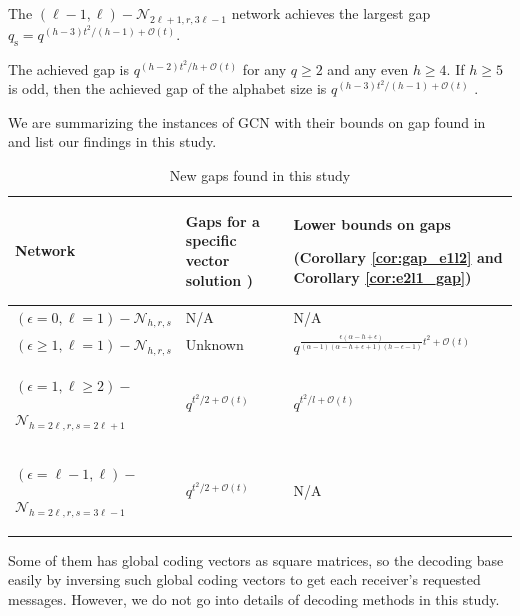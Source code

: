 The $\left(\ell-1,\ell\right)-\mathcal{N}_{2\ell+1,r,3\ell-1}$ network
achieves the largest gap $q_{\mathrm{s}}=q^{(h-3)t^{2}/\left(h-1\right)+\mathcal{O}(t)}$.
\begin{rem}
The achieved gap is $q^{(h-2)t^{2}/h+\mathcal{O}(t)}$ for any $q\geq2$
and any even $h\geq4$. If $h\geq5$ is odd, then the achieved gap
of the alphabet size is $q^{(h-3)t^{2}/\left(h-1\right)+\mathcal{O}(t)}$
\cite{Wachter-Zeh:2018}.
\end{rem}
We are summarizing the instances of GCN with their bounds on gap found
in \cite{Wachter-Zeh:2018} and list our findings in this study.
\begin{table}

\caption{New gaps found in this study \label{tab:New-gap-found}}

\begin{centering}
\begin{tabular}{|>{\centering}p{0.15\paperwidth}|>{\centering}p{0.1\paperwidth}|>{\centering}p{0.2\paperwidth}|}
\hline 
\centering{}Network & \centering{}Gaps for a specific vector solution \cite{Wachter-Zeh:2018}) & \begin{centering}
Lower bounds on gaps 
\par\end{centering}
\centering{}(Corollary \ref{cor:gap_e1l2} and Corollary \ref{cor:e2l1_gap})\tabularnewline
\hline 
\hline 
\centering{}$\left(\epsilon=0,\ell=1\right)-\mathcal{N}_{h,r,s}$ & \centering{}N/A & \centering{}N/A\tabularnewline
\hline 
\centering{}$\left(\epsilon\geq1,\ell=1\right)-\mathcal{N}_{h,r,s}$ & \centering{}Unknown & \centering{}$q^{\frac{\epsilon\left(\alpha-h+\epsilon\right)}{\left(\alpha-1\right)\left(\alpha-h+\epsilon+1\right)\left(h-\epsilon-1\right)}t^{2}+\mathcal{O}(t)}$\tabularnewline
\hline 
\begin{centering}
$(\epsilon=1,\ell\geq2)-$
\par\end{centering}
$\mathcal{N}_{h=2\ell,r,s=2\ell+1}$ & \centering{}$q^{t^{2}/2+\mathcal{O}\left(t\right)}$ & \centering{}$q^{t^{2}/l+\mathcal{O}\left(t\right)}$\tabularnewline
\hline 
\begin{centering}
$\left(\epsilon=\ell-1,\ell\right)-$
\par\end{centering}
$\mathcal{N}_{h=2\ell,r,s=3\ell-1}$ & \centering{}$q^{t^{2}/2+\mathcal{O}\left(t\right)}$ & \centering{}N/A\tabularnewline
\hline 
\end{tabular}
\par\end{centering}
\end{table}
Some of them has global coding vectors as square matrices, so the
decoding base easily by inversing such global coding vectors to get
each receiver's requested messages. However, we do not go into details
of decoding methods in this study.

\clearpage